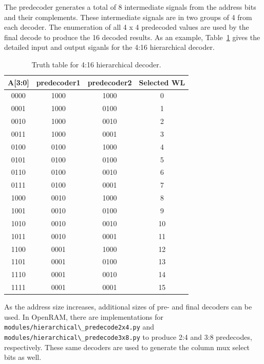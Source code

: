 The predecoder generates a total of 8 intermediate signals from the
address bits and their complements. These intermediate signals are in
two groups of 4 from each decoder. The enumeration of all 4 x 4
predecoded values are used by the final decode to produce the 16
decoded results.  As an example, Table~\ref{table:4-16 hierarchical_decoder}
gives the detailed input and output siganls for the 4:16 hierarchical
decoder.


 \begin{table}[h!] 
   \begin{center}
     \begin{tabular}{| c | c | c | c |}
     \hline
     A[3:0] & predecoder1 & predecoder2 & Selected WL\\ \hline
     0000 & 1000 & 1000 & 0\\ \hline
     0001 & 1000 & 0100 & 1\\ \hline
     0010 & 1000 & 0010 & 2\\ \hline
     0011 & 1000 & 0001 & 3\\ \hline
     0100 & 0100 & 1000 & 4\\ \hline
     0101 & 0100 & 0100 & 5\\ \hline
     0110 & 0100 & 0010 & 6\\ \hline
     0111 & 0100 & 0001 & 7\\ \hline
     1000 & 0010 & 1000 & 8\\ \hline
     1001 & 0010 & 0100 & 9\\ \hline
     1010 & 0010 & 0010 & 10\\ \hline
     1011 & 0010 & 0001 & 11\\ \hline
     1100 & 0001 & 1000 & 12\\ \hline
     1101 & 0001 & 0100 & 13\\ \hline
     1110 & 0001 & 0010 & 14\\ \hline
     1111 & 0001 & 0001 & 15\\ \hline
     \end{tabular}
   \end{center}
   \caption{Truth table for 4:16 hierarchical decoder.}
   \label{table:4-16 hierarchical_decoder}
 \end{table}


As the address size increases, additional sizes of pre- and final
decoders can be used.  In OpenRAM, there are implementations for
\verb|modules/hierarchical\_predecode2x4.py| and
\verb|modules/hierarchical\_predecode3x8.py| to produce 2:4 and 3:8
predecodes, respectively. These same decoders are used to generate the
column mux select bits as well.

